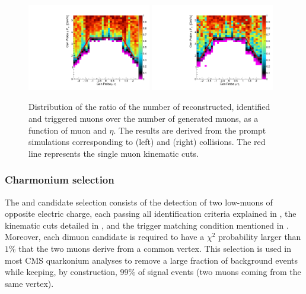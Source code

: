 \begin{figure}[htb!]
 \centering 
  \includegraphics[width=0.48\textwidth]{Figures/Charmonia/Analysis/EventSelection/pp_AccxEff_SingleMuons}
  \includegraphics[width=0.48\textwidth]{Figures/Charmonia/Analysis/EventSelection/PbPb_AccxEff_SingleMuons} 
 \caption{Distribution of the ratio of the number of reconstructed, identified and triggered muons over the number of generated muons, as a function of muon \pt and $\eta$. The results are derived from the prompt \JPsi simulations corresponding to \Runpp (left) and \RunPbPb (right) collisions. The red line represents the single muon kinematic cuts.}
 \label{fig:SingleMuonAccEff}
\end{figure}


\subsubsection{Charmonium selection} \label{sec:Charmonia_Analysis_Selection_CharmoniumSelection}

The \JPsiToMuMu and \PsiPToMuMu candidate selection consists of the detection of two low-\pt muons of opposite electric charge, each passing all identification criteria explained in , the kinematic cuts detailed in , and the trigger matching condition mentioned in . Moreover, each dimuon candidate is required to have a $\chi^2$ probability larger than $1\%$ that the two muons derive from a common vertex. This selection is used in most CMS quarkonium analyses to remove a large fraction of background events while keeping, by construction, 99\% of signal events (two muons coming from the same vertex).


